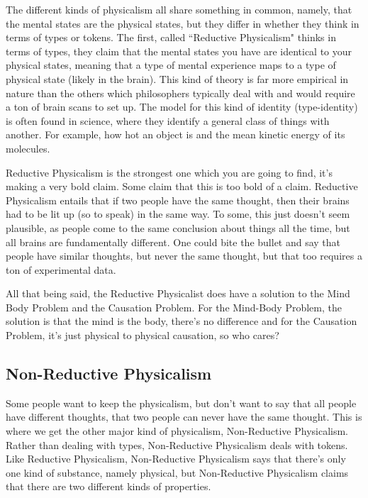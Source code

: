 The different kinds of physicalism all share something in common, namely, that the mental states are the physical states, but they differ in whether they think in terms of types or tokens. The first, called ``Reductive Physicalism" thinks in terms of types, they claim that the mental states you have are identical to your physical states, meaning that a type of mental experience maps to a type of physical state (likely in the brain). This kind of theory is far more empirical in nature than the others which philosophers typically deal with and would require a ton of brain scans to set up. The model for this kind of identity (type-identity) is often found in science, where they identify a general class of things with another. For example, how hot an object is and the mean kinetic energy of its molecules. 

Reductive Physicalism is the strongest one which you are going to find, it's making a very bold claim. Some claim that this is too bold of a claim. Reductive Physicalism entails that if two people have the same thought, then their brains had to be lit up (so to speak) in the same way. To some, this just doesn't seem plausible, as people come to the same conclusion about things all the time, but all brains are fundamentally different. One could bite the bullet and say that people have similar thoughts, but never the same thought, but that too requires a ton of experimental data. 

All that being said, the Reductive Physicalist does have a solution to the Mind Body Problem and the Causation Problem. For the Mind-Body Problem, the solution is that the mind is the body, there's no difference and for the Causation Problem, it's just physical to physical causation, so who cares? 

\subsection{Non-Reductive Physicalism}

Some people want to keep the physicalism, but don't want to say that all people have different thoughts, that two people can never have the same thought. This is where we get the other major kind of physicalism, Non-Reductive Physicalism. Rather than dealing with types, Non-Reductive Physicalism deals with tokens. Like Reductive Physicalism, Non-Reductive Physicalism says that there's only one kind of substance, namely physical, but Non-Reductive Physicalism claims that there are two different kinds of properties.

